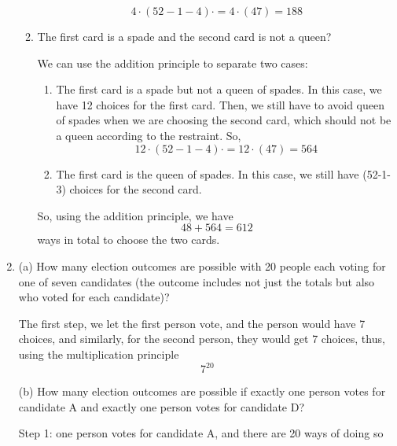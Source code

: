 \documentclass[12pt]{amsart}
\begin{document}
\begin{enumerate}
\begin{enumerate}
   \begin{displaymath}
   4\cdot (52-1-4) \cdot = 4\cdot (47) = 188
  \end{displaymath}
  \smallskip
  
 \item The first card is a spade and the second card is not a queen?\smallskip
  
\smallskip We can use the addition principle to separate two cases: 
   \begin{enumerate}
  \item The first card is a spade but not a queen of spades. In this case, we have 12 choices
  for the first card. Then, we still have to avoid queen of spades when we are choosing the second card, which should not be a queen according to the restraint. So,
  \begin{displaymath}
   12\cdot (52-1-4) \cdot = 12\cdot (47) = 564
  \end{displaymath}
  \item The first card is the queen of spades. In this case, we still have (52-1-3) choices for the second card.
   \end{enumerate}
  \bigskip
   So, using the addition principle, we have
   \begin{displaymath}
   48+564=612 
  \end{displaymath}
  ways in total to choose the two cards.

\bigskip



\end{enumerate}
 \item 
  (a) How many election outcomes are possible with 20 people each voting for
one of seven candidates (the outcome includes not just the totals but also
who voted for each candidate)?    

\bigskip 
The first step, we let the first person vote, and the person would have 7 choices, and similarly, for the second person, they would get 7 choices, thus, using the multiplication principle
     \begin{displaymath}
     7^{20}
  \end{displaymath}

(b) How many election outcomes are possible if exactly one person votes for
candidate A and exactly one person votes for candidate D?
 \bigskip
 
Step 1: one person votes for candidate A, and there are 20 ways of doing so \\ 


\end{enumerate}
\end{document}
